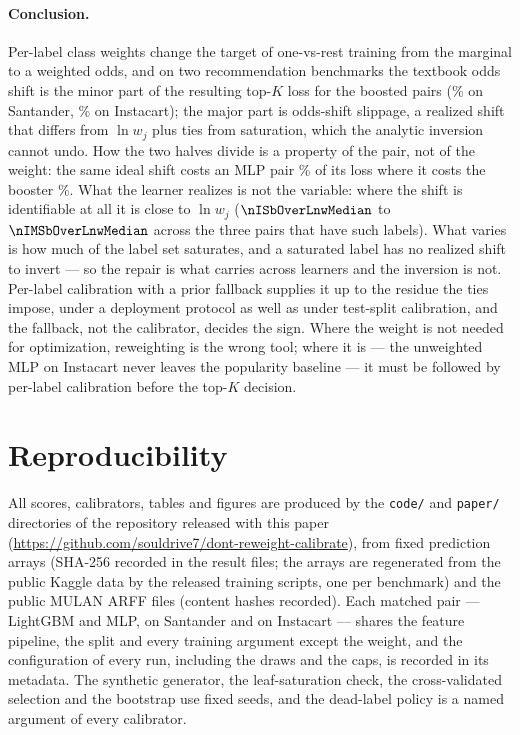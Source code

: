 \documentclass[sigconf,nonacm]{acmart}
\begin{document}
\paragraph{Conclusion.} Per-label class weights change the target of one-vs-rest training from the marginal to a weighted odds, and on two recommendation benchmarks the textbook odds shift is the minor part of the resulting top-$K$ loss for the boosted pairs (\noddsShare\% on Santander, \nIoddsShare\% on Instacart); the major part is odds-shift slippage, a realized shift that differs from $\ln w_j$ plus ties from saturation, which the analytic inversion cannot undo. How the two halves divide is a property of the pair, not of the weight: the same ideal shift costs an MLP pair \nModdsShare\% of its loss where it costs the booster \noddsShare\%. What the learner realizes is not the variable: where the shift is identifiable at all it is close to $\ln w_j$ ($\nISbOverLnwMedian$ to $\nIMSbOverLnwMedian$ across the three pairs that have such labels). What varies is how much of the label set saturates, and a saturated label has no realized shift to invert --- so the repair is what carries across learners and the inversion is not. Per-label calibration with a prior fallback supplies it up to the residue the ties impose, under a deployment protocol as well as under test-split calibration, and the fallback, not the calibrator, decides the sign. Where the weight is not needed for optimization, reweighting is the wrong tool; where it is --- the unweighted MLP on Instacart never leaves the popularity baseline --- it must be followed by per-label calibration before the top-$K$ decision.

\section*{Reproducibility}
All scores, calibrators, tables and figures are produced by the \texttt{code/} and \texttt{paper/} directories of the repository released with this paper (\url{https://github.com/souldrive7/dont-reweight-calibrate}), from fixed prediction arrays (SHA-256 recorded in the result files; the arrays are regenerated from the public Kaggle data by the released training scripts, one per benchmark) and the public MULAN ARFF files (content hashes recorded). Each matched pair --- LightGBM and MLP, on Santander and on Instacart --- shares the feature pipeline, the split and every training argument except the weight, and the configuration of every run, including the \nseedN{} draws and the \ncapN{} caps, is recorded in its metadata. The synthetic generator, the leaf-saturation check, the cross-validated selection and the bootstrap use fixed seeds, and the dead-label policy is a named argument of every calibrator.
\end{document}
